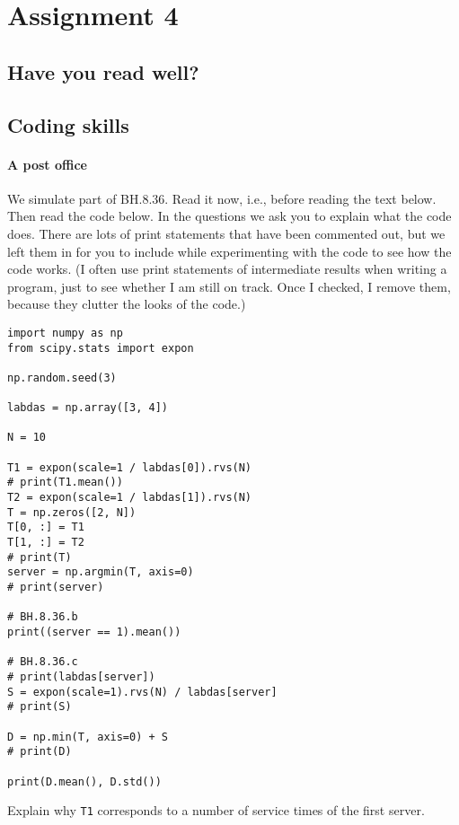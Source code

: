 \documentclass[assignments]{subfiles}
\begin{document}
\section{Assignment 4}


\subsection{Have you read well?}


\subsection{Coding skills}
\label{sec:coding-skills-1}

\paragraph{A post office}

We simulate part of BH.8.36.
Read it now, i.e., before reading the text below.
Then read the code below.
In the questions we ask you to explain what the code does.
There are lots of print statements that have been commented out, but we left them in for you to include while experimenting with the code to see how the code works.
(I often use print statements of intermediate results when writing a program, just to see whether I am still on track.
Once I checked, I remove them, because they clutter the looks of the code.)

\begin{verbatim}
import numpy as np
from scipy.stats import expon

np.random.seed(3)

labdas = np.array([3, 4])

N = 10

T1 = expon(scale=1 / labdas[0]).rvs(N)
# print(T1.mean())
T2 = expon(scale=1 / labdas[1]).rvs(N)
T = np.zeros([2, N])
T[0, :] = T1
T[1, :] = T2
# print(T)
server = np.argmin(T, axis=0)
# print(server)

# BH.8.36.b
print((server == 1).mean())

# BH.8.36.c
# print(labdas[server])
S = expon(scale=1).rvs(N) / labdas[server]
# print(S)

D = np.min(T, axis=0) + S
# print(D)

print(D.mean(), D.std())
\end{verbatim}

\begin{exercise}
Explain why  \texttt{T1} corresponds to a number of service times of the first server.
\begin{solution}
\end{solution}
\end{exercise}
\end{document}
